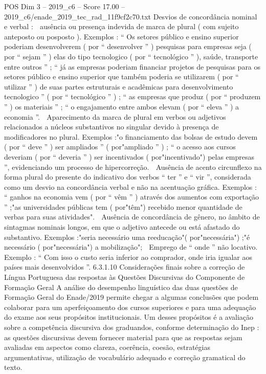 \begin{textsample}{POS Dim 3 – 2019\_c6 – Score 17.00 – 2019\_c6/enade\_2019\_tec\_rad\_11f9cf2c70.txt}
Desvios de concordância nominal e verbal :  ausência ou presença indevida de marca de plural ( com sujeito anteposto ou posposto ).
Exemplos : “ Os setores público e ensino superior poderiam desenvolverem ( por “ desenvolver ” ) pesquisas para empresas seja ( por “ sejam ” ) elas do tipo tecnologico ( por “ tecnológico ” ), saúde, transporte entre outros ” ; “ já as empresas poderiam financiar projetos de pesquisas para os setores público e ensino superior que também poderia se utilizarem ( por “ utilizar ” ) de suas partes estruturais e acadêmicas para desenvolvimento tecnologico ” ( por “ tecnológico ” ) ; “ as empresas que produz ( por “ produzem ” ) os materiais ” ; “ o engajamento entre ambos elevam ( por “ eleva ” ) a economia ”.  Aparecimento da marca de plural em verbos ou adjetivos relacionados a núcleos substantivos no singular devido à presença de modificadores no plural.
Exemplos :"o financiamento das bolsas de estudo devem ( por “ deve ” ) ser ampliados ” ( por"ampliado ” ) ; “ o acesso aos cursos deveriam ( por “ deveria ” ) ser incentivados ( por"incentivado") pelas empresas ”, evidenciando um processo de hipercorreção.  Ausência de acento circunflexo na forma plural do presente do indicativo dos verbos “ ter ” e “ vir ”, considerada como um desvio na concordância verbal e não na acentuação gráfica.
Exemplos : “ ganhos na economia vem ( por “ vêm ” ) através dos aumentos com exportação ” ;"as universidades públicas tem ( por"têm") recebido menor quantidade de verbas para suas atividades".  Ausência de concordância de gênero, no âmbito de sintagmas nominais longos, em que o adjetivo antecede ou está afastado do substantivo.
Exemplos :"seria necessário uma reeducação"( por"necessária") ;"é necessário ( por"necessária") a mobilização";  Emprego de “ onde ” não locativo.
Exemplo : “ Com isso o custo seria inferior ao comprador, onde iria igualar aos países mais desenvolvidos ”. 6.3.1.10 Considerações finais sobre a correção de Língua Portuguesa das respostas às Questões Discursivas do Componente de Formação Geral A análise do desempenho linguístico das duas questões de Formação Geral do Enade/2019 permite chegar a algumas conclusões que podem colaborar para um aperfeiçoamento dos cursos superiores e para uma adequação do exame aos seus propósitos institucionais.
Um desses propósitos é a avaliação sobre a competência discursiva dos graduandos, conforme determinação do Inep : as questões discursivas devem fornecer material para que as respostas sejam avaliadas em aspectos como clareza, coerência, coesão, estratégias argumentativas, utilização de vocabulário adequado e correção gramatical do texto.

\end{textsample}
